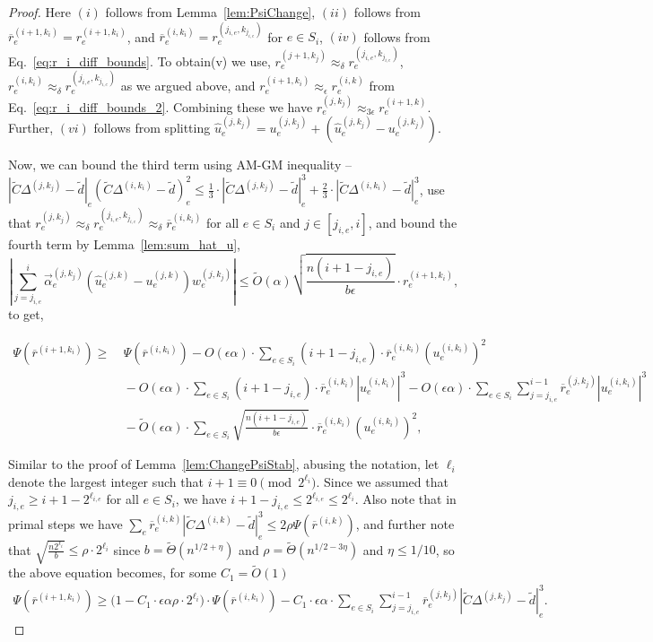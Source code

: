 \documentclass[11pt]{article}
\newcommand\dd{\boldsymbol{\mathit{d}}}
\newcommand\rr{\boldsymbol{\mathit{r}}}
\newcommand\uu{\boldsymbol{\mathit{u}}}
\newcommand\ww{\boldsymbol{\mathit{w}}}
\newcommand\rrbar{\overline{\boldsymbol{\mathit{r}}}}
\newcommand\CC{\boldsymbol{\mathit{C}}}
\newcommand\Otil{\widetilde{O}}
\newcommand{\wh}{\widehat}
\newcommand{\wt}{\widetilde}
\newcommand{\ov}{\overline}
\begin{document}
\begin{proof}
Here $(i)$ follows from Lemma~\ref{lem:PsiChange}, $(ii)$ follows from $\ov{\rr}^{(i+1,k_i)}_e = \rr^{(i+1,k_i)}_e$, and $\ov{\rr}^{(i,k_i)}_e = \rr^{(j_{i,e},k_{j_{i,e}})}_e$ for $e \in S_i$, $(iv)$ follows from Eq.~\eqref{eq:r_i_diff_bounds}. To obtain(v) we use, $\rr_e^{(j+1,k_j)} \approx_{\delta} \rr_e^{(j_{i,e},k_{j_{i,e}})}$, $\rr_e^{(i,k_i)} \approx_{\delta} \rr_e^{(j_{i,e},k_{j_{i,e}})}$ as we argued above, and $\rr_e^{(i+1,k_i)} \approx_{\epsilon} \rr_e^{(i,k)}$ from Eq.~\eqref{eq:r_i_diff_bounds_2}. Combining these we have $\rr_e^{(j,k_j)} \approx_{3\epsilon} \rr_e^{(i+1,k)}$. Further, $(vi)$ follows from splitting $\wh{\uu}^{(j,k_j)}_e = \uu^{(j,k_j)}_e + (\wh{\uu}^{(j,k_j)}_e - \uu^{(j,k_j)}_e)$.


Now, we can bound the third term using AM-GM inequality --  $|\wt{\CC}\Delta^{(j,k_j)}-\wt{\dd}|_e (\wt{\CC}\Delta^{(i,k_i)}-\wt{\dd})_e^2 \leq \frac{1}{3} \cdot |\wt{\CC}\Delta^{(j,k_j)}-\wt{\dd}|_e^3 + \frac{2}{3} \cdot |\wt{\CC}\Delta^{(i,k_i)}-\wt{\dd}|_e^3$, use that $\rr_e^{(j,k_j)} \approx_{\delta} \rr_e^{(j_{i,e},k_{j_{i,e}})} \approx_{\delta} \ov{\rr}_e^{(i,k_i)}$ for all $e \in S_i$ and $j \in [j_{i,e}, i]$, and bound the fourth term by Lemma~\ref{lem:sum_hat_u},
\[
|\sum_{j=j_{i,e}}^i \overrightarrow{\alpha}_e^{(j,k_j)}  (\wh{\uu}^{(j,k)}_e - \uu^{(j,k)}_e) \ww_e^{(j,k_j)}| \leq \Otil(\alpha)\sqrt{\frac{n (i + 1 - j_{i,e})}{b\epsilon}} \cdot \rr_e^{(i+1,k_i)},
\]
to get,

\begin{align*}
\Psi(\ov{\rr}^{(i+1,k_i)}) 
\geq &~ \Psi(\ov{\rr}^{(i,k_i)}) - O(\epsilon \alpha) \cdot \sum_{e \in S_i} (i + 1 - j_{i,e}) \cdot \ov{\rr}^{(i,k_i)}_e (\uu^{(i,k_i)}_e)^2 \\
&~ - O(\epsilon \alpha) \cdot \sum_{e \in S_i} (i + 1 - j_{i,e}) \cdot \ov{\rr}^{(i,k_i)}_e |\uu^{(i,k_i)}_e|^3 
 - O(\epsilon \alpha) \cdot \sum_{e \in S_i} \sum_{j=j_{i,e}}^{i-1} \ov{\rr}^{(j,k_j)}_e |\uu^{(i,k_i)}_e|^3 \\
&~ - \Otil(\epsilon\alpha) \cdot \sum_{e \in S_i}\sqrt{\frac{n (i + 1 - j_{i,e})}{b\epsilon}} \cdot \ov{\rr}^{(i,k_i)}_e (\uu^{(i,k_i)}_e)^2,
\end{align*}

Similar to the proof of Lemma~\ref{lem:ChangePsiStab}, abusing the notation, let $\ell_i$ denote the largest integer such that $i+1 \equiv 0 \pmod{2^{\ell_i}}$. Since we assumed that $j_{i,e} \geq i+1-2^{\ell_{i,e}}$ for all $e \in S_i$, we have $i+1 - j_{i,e} \leq 2^{\ell_{i,e}} \leq 2^{\ell_i}$. Also note that in primal steps we have $\sum_e \rrbar_e^{(i,k)} |\wt{\CC}\Delta^{(i,k)}-\wt{\dd}|_e^3\leq 2\rho\Psi(\rrbar^{(i,k)})$, and further note that $\sqrt{\frac{n 2^{\ell_i}}{b}} \leq \rho \cdot 2^{\ell_i}$ since $b = \wt{\Theta}(n^{1/2+\eta})$ and $\rho = \wt{\Theta}(n^{1/2-3\eta})$ and $\eta \leq 1/10$, so the above equation becomes, for some $C_1 = \wt{O}(1)$
\begin{align}
\Psi(\ov{\rr}^{(i+1,k_i)}) \geq \Big( 1 - C_1 \cdot \epsilon \alpha \rho \cdot 2^{\ell_i} \Big) \cdot \Psi(\ov{\rr}^{(i,k_i)}) - C_1 \cdot \epsilon \alpha \cdot \sum_{e \in S_i} \sum_{j=j_{i,e}}^{i-1} \ov{\rr}^{(j,k_j)}_e |\wt{\CC}\Delta^{(j,k_j)}-\wt{\dd}|_e^3.
\end{align}


\end{proof}
\end{document}
